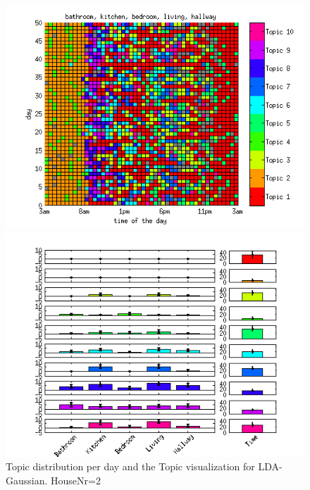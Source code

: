 \begin{figure}
 \centering
 \begin{minipage}[b]{0.45\linewidth}
  \centering
  \includegraphics[width=\textwidth]{Pictures/Gaus/DayHN2TS48k20.png}
 \end{minipage}
 \begin{minipage}[b]{0.45\linewidth}
  \centering
  \includegraphics[width=\textwidth]{Pictures/Gaus/TopHN2TS48k20.png}
 \end{minipage}
 \caption{Topic distribution per day and the Topic visualization for LDA-Gaussian. HouseNr=2}
\end{figure}

